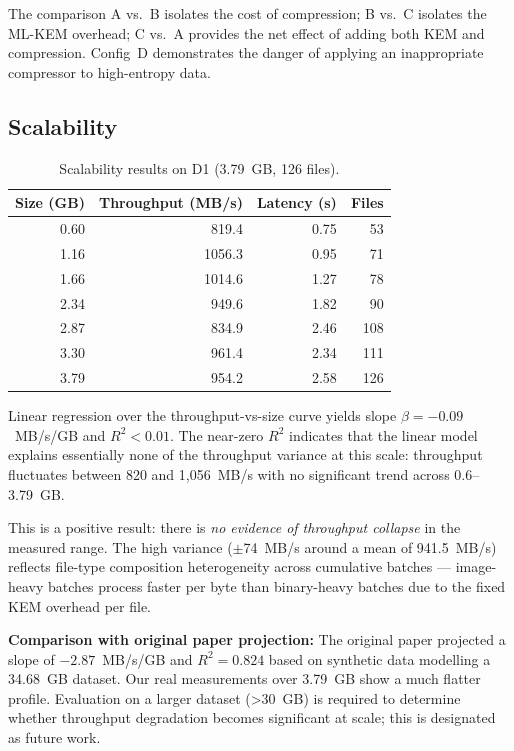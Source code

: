 \documentclass[twocolumn]{article}
\begin{document}
The comparison A vs.\ B isolates the cost of compression; B vs.\ C isolates the
ML-KEM overhead; C vs.\ A provides the net effect of adding both KEM and
compression. Config~D demonstrates the danger of applying an inappropriate
compressor to high-entropy data.

\subsection{Scalability}

\begin{table}[t]
\caption{Scalability results on D1 (3.79~GB, 126 files).}
\label{tab:scalability}
\centering\small
\begin{tabular}{rrrr}
\toprule
Size (GB) & Throughput (MB/s) & Latency (s) & Files \\
\midrule
0.60 & 819.4 & 0.75 & 53 \\
1.16 & 1056.3 & 0.95 & 71 \\
1.66 & 1014.6 & 1.27 & 78 \\
2.34 & 949.6 & 1.82 & 90 \\
2.87 & 834.9 & 2.46 & 108 \\
3.30 & 961.4 & 2.34 & 111 \\
3.79 & 954.2 & 2.58 & 126 \\
\bottomrule
\end{tabular}
\end{table}

Linear regression over the throughput-vs-size curve yields slope $\beta = -0.09$~MB/s/GB
and $R^2 < 0.01$. The near-zero $R^2$ indicates that the linear model explains
essentially none of the throughput variance at this scale: throughput fluctuates
between 820 and 1,056~MB/s with no significant trend across 0.6--3.79~GB.

This is a positive result: there is \emph{no evidence of throughput collapse} in
the measured range. The high variance ($\pm$74~MB/s around a mean of
941.5~MB/s) reflects file-type composition heterogeneity across cumulative batches
--- image-heavy batches process faster per byte than binary-heavy batches due to
the fixed KEM overhead per file.

\textbf{Comparison with original paper projection:} The original paper projected a
slope of $-2.87$~MB/s/GB and $R^2 = 0.824$ based on synthetic data modelling a
34.68~GB dataset. Our real measurements over 3.79~GB show a much flatter profile.
Evaluation on a larger dataset (>30~GB) is required to determine whether
throughput degradation becomes significant at scale; this is designated as future
work.
\end{document}

